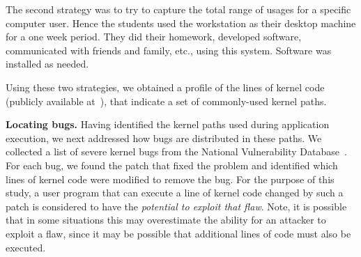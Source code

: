 The second strategy was to try to capture the total range of usages for a
specific computer user. Hence the students used the workstation as their
desktop machine for a one week period. They did their homework, developed
software, communicated with friends and family, etc., using this system. 
Software was installed as needed.

Using these two strategies, we obtained a profile of the lines of
kernel code (publicly available at~\cite{Lind}), that indicate
a set of commonly-used kernel paths.



\textbf{Locating bugs.}
Having identified the kernel paths used during application execution, we next 
addressed how bugs are distributed in these paths. We collected a list of
severe kernel bugs from the National Vulnerability Database~\cite{NVD}. 
For each bug, we
found the patch that fixed the problem and identified
which lines of kernel code were modified to remove the bug.
For the purpose of this study, a user program that can execute a line of kernel
code changed by such a patch is considered to have the \textit{potential to
exploit that flaw}.  Note, it is possible that in some situations this may
overestimate the ability for an attacker to exploit a flaw, since it may be
possible that additional lines of code must also be executed.


